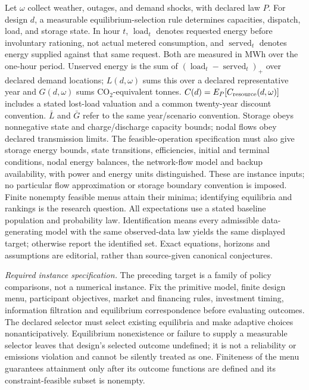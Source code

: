\documentclass[11pt,a4paper]{article}
\begin{document}
Let \(\omega\) collect weather, outages, and demand shocks, with declared law \(P\). For design \(d\), a measurable equilibrium-selection rule determines capacities, dispatch, load, and storage state. In hour \(t\), \(\operatorname{load}_t\) denotes requested energy before involuntary rationing, not actual metered consumption, and \(\operatorname{served}_t\) denotes energy supplied against that same request. Both are measured in MWh over the one-hour period. Unserved energy is the sum of \((\operatorname{load}_t-\operatorname{served}_t)_+\) over declared demand locations; \(L(d,\omega)\) sums this over a declared representative year and \(G(d,\omega)\) sums CO\(_2\)-equivalent tonnes. \(C(d)=E_P[C_{\rm resource}(d,\omega)]\) includes a stated lost-load valuation and a common twenty-year discount convention. \(\bar L\) and \(\bar G\) refer to the same year/scenario convention. Storage obeys nonnegative state and charge/discharge capacity bounds; nodal flows obey declared transmission limits. The feasible-operation specification must also give storage energy bounds, state transitions, efficiencies, initial and terminal conditions, nodal energy balances, the network-flow model and backup availability, with power and energy units distinguished. These are instance inputs; no particular flow approximation or storage boundary convention is imposed. Finite nonempty feasible menus attain their minima; identifying equilibria and rankings is the research question. All expectations use a stated baseline population and probability law. Identification means every admissible data-generating model with the same observed-data law yields the same displayed target; otherwise report the identified set. Exact equations, horizons and assumptions are editorial, rather than source-given canonical conjectures.

\textit{Required instance specification.} The preceding target is a family of policy comparisons, not a numerical instance. Fix the primitive model, finite design menu, participant objectives, market and financing rules, investment timing, information filtration and equilibrium correspondence before evaluating outcomes. The declared selector must select existing equilibria and make adaptive choices nonanticipatively. Equilibrium nonexistence or failure to supply a measurable selector leaves that design's selected outcome undefined; it is not a reliability or emissions violation and cannot be silently treated as one. Finiteness of the menu guarantees attainment only after its outcome functions are defined and its constraint-feasible subset is nonempty.
\end{document}
